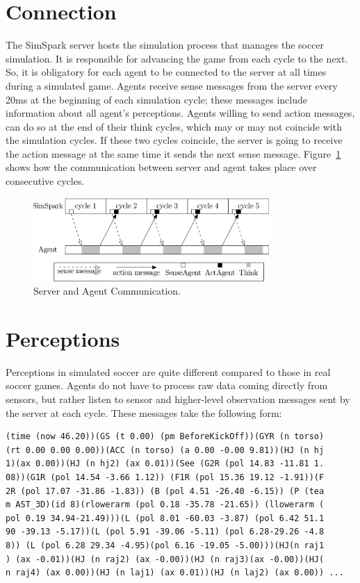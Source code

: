\section{Connection}
The SimSpark server hosts the simulation process that manages the soccer simulation. It is responsible for advancing the game from each cycle to the next. So, it is obligatory for each agent to be connected to the server at all times during a simulated game. Agents receive sense messages from the server every 20ms at the beginning of each simulation cycle; these messages include information about all agent's perceptions. Agents willing to send action messages, can do so at the end of their think cycles, which may or may not coincide with the simulation cycles. If these two cycles coincide, the server is going to receive the action message at the same time it sends the next sense message. Figure~\ref{fig:Simulation-Update-Loop} shows how the communication between server and agent takes place over consecutive cycles.

\begin{figure}[t!]
\centering
  \includegraphics[width=0.8\textwidth]{Chapter3/figures/SimulationUpdateLoopSynchronizationBetweenSimSparkAndAgent.png}
  \caption{Server and Agent Communication.}
  \label{fig:Simulation-Update-Loop}
\end{figure}



\section{Perceptions}
Perceptions in simulated soccer are quite different compared to those in  real soccer games. Agents do not have to process raw data coming directly from sensors, but rather listen to sensor and higher-level observation messages sent by the server at each cycle. These messages take the following form:

\begin{verbatim}
(time (now 46.20))(GS (t 0.00) (pm BeforeKickOff))(GYR (n torso)
(rt 0.00 0.00 0.00))(ACC (n torso) (a 0.00 -0.00 9.81))(HJ (n hj
1)(ax 0.00))(HJ (n hj2) (ax 0.01))(See (G2R (pol 14.83 -11.81 1.
08))(G1R (pol 14.54 -3.66 1.12)) (F1R (pol 15.36 19.12 -1.91))(F
2R (pol 17.07 -31.86 -1.83)) (B (pol 4.51 -26.40 -6.15)) (P (tea
m AST_3D)(id 8)(rlowerarm (pol 0.18 -35.78 -21.65)) (llowerarm (
pol 0.19 34.94-21.49)))(L (pol 8.01 -60.03 -3.87) (pol 6.42 51.1
90 -39.13 -5.17))(L (pol 5.91 -39.06 -5.11) (pol 6.28-29.26 -4.8
8)) (L (pol 6.28 29.34 -4.95)(pol 6.16 -19.05 -5.00)))(HJ(n raj1
) (ax -0.01))(HJ (n raj2) (ax -0.00))(HJ (n raj3)(ax -0.00))(HJ(
n raj4) (ax 0.00))(HJ (n laj1) (ax 0.01))(HJ (n laj2) (ax 0.00)) ...\end{verbatim}

